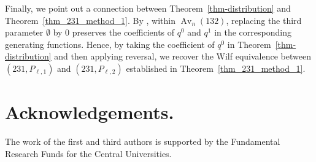 \documentclass[11pt]{article}
\begin{document}
Finally, we point out a connection between Theorem~\ref{thm-distribution} and
Theorem~\ref{thm_231_method_1}. By \cite[Corollary~1]{QiuRemmel2018}, within
$\operatorname{Av}_n(132)$, replacing the third parameter $\emptyset$ by $0$
preserves the coefficients of $q^0$ and $q^1$ in the corresponding
generating functions. Hence, by taking the coefficient of $q^0$ in
Theorem~\ref{thm-distribution} and then applying reversal, we recover the
Wilf equivalence between $(231,P_{\ell,1})$ and $(231,P_{\ell,2})$
established in Theorem~\ref{thm_231_method_1}.


\section*{Acknowledgements.}
The work of the first and third authors is supported by the Fundamental Research Funds 
for the Central Universities.
\end{document}
